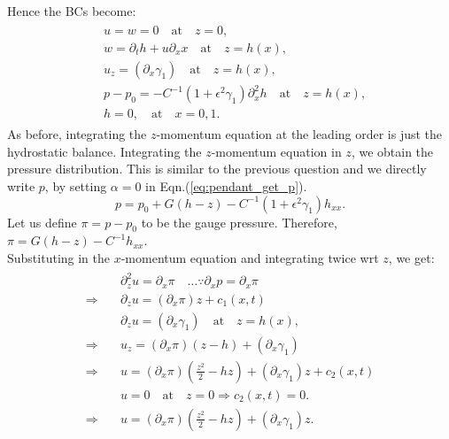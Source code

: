 \documentclass{article}
\begin{document}
Hence the BCs become:
\begin{align}\label{eq:marangoni_bcs_dimless}
 \begin{split}
  & u = w = 0 \quad \textrm{at} \quad z = 0,\\
  & w = \partial_{t}h + u \partial_{x} x \quad \textrm{at} \quad z = h(x),\\
  & u_{z} = (\partial_{x}\gamma_{1}) \quad \textrm{at} \quad z = h(x),\\
  & p - p_{0} = -C^{-1} (1 + \epsilon^{2}\gamma_{1})\partial_{x}^{2}h \quad \textrm{at} \quad z = h(x),\\
  & h = 0, \quad \textrm{at} \quad x = 0, 1.
 \end{split}
\end{align}
As before, integrating the $z$-momentum equation at the leading order is just the hydrostatic balance. Integrating the $z$-momentum equation in $z$, we obtain the pressure distribution. This is similar to the previous question and we directly write $p$, by setting $\alpha = 0$ in Eqn.(\ref{eq:pendant_get_p}). 
\begin{equation}\label{eq:marangoni_p}
 p = p_{0} + G(h-z) - C^{-1}(1 + \epsilon^{2}\gamma_{1})h_{xx}.
\end{equation}
Let us define $\pi = p - p_{0}$ to be the gauge pressure. Therefore, $\pi = G(h-z) - C^{-1}h_{xx}$.\\
Substituting in the $x$-momentum equation and integrating twice wrt $z$, we get:
\begin{align}\label{eq:marangoni_u}
 \begin{split}
  & \partial^{2}_{z}u = \partial_{x}\pi \quad  \hdots \because \partial_{x}p = \partial_{x}\pi \\
  \Rightarrow \quad & \partial_{z}u = (\partial_{x}\pi)z + c_{1}(x, t)\\
  & \partial_{z} u = (\partial_{x}\gamma_{1}) \quad \textrm{at} \quad z = h(x),\\
  \Rightarrow \quad & u_{z} = (\partial_{x}\pi)(z-h) + (\partial_{x}\gamma_{1})\\
  \Rightarrow \quad & u =  (\partial_{x}\pi)\left(\frac{z^{2}}{2}-hz\right) + (\partial_{x}\gamma_{1})z + c_{2}(x, t)\\
  & u = 0 \quad \textrm{at} \quad z = 0 \Rightarrow c_{2}(x, t) = 0.\\
  \Rightarrow \quad & \boxed{ u =  (\partial_{x}\pi)\left(\frac{z^{2}}{2}-hz\right) + (\partial_{x}\gamma_{1})z }.
 \end{split}
\end{align}
\end{document}

